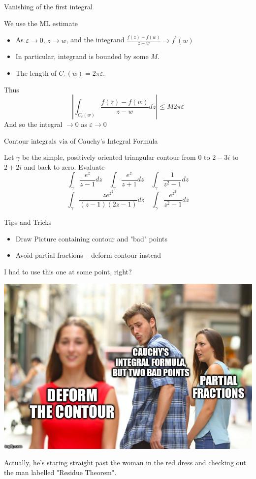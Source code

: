 \documentclass{beamer}
\begin{document}
\begin{frame}{Vanishing of the first integral}
\begin{block}{We use the ML estimate}
\begin{itemize}
    \item As $\varepsilon\to 0$, $z\to w$, and the integrand $\frac{f(z)-f(w)}{z-w}\to f^\prime(w)$
    \item In particular, integrand is bounded by some $M$.
 \item The length of $C_{\varepsilon}(w)=2\pi \varepsilon$.
\end{itemize}
Thus
$$\left|\int_{C_\varepsilon(w)}  \frac{f(z)-f(w)}{z-w}dz\right|\leq M2\pi\varepsilon$$
And so the integral $\to 0$ as $\varepsilon\to 0$


\end{block}
\end{frame}
\begin{frame}{Contour integrals via of Cauchy's Integral Formula}
\begin{example}[Section 9.3]Let $\gamma$ be the simple, positively oriented triangular contour from 0 to $2-3i$ to $2+2i$ and back to zero.  Evaluate
$$\int_\gamma \frac{e^z}{z-1}dz \quad \int_\gamma \frac{e^z}{z+1}dz \quad \int_\gamma \frac{1}{z^2-1}dz $$
$$\int_\gamma \frac{ze^{z^2}}{(z-1)(2z-1)}dz \quad \int_\gamma \frac{e^{z^2}}{z^2-1}dz$$

\end{example}

\begin{block}{Tips and Tricks}
\begin{itemize}

\item \alert{Draw Picture} containing contour and "bad" points
\item Avoid partial fractions -- deform contour instead \Cooley
\end{itemize}
\end{block}
\end{frame}

\begin{frame}{I had to use this one at some point, right?}

\includegraphics[width=\textwidth,height=0.8\textheight,keepaspectratio]{DistractedCauchy.jpg}

Actually, he's staring straight past the woman in the red dress and checking out the man labelled "Residue Theorem".
\end{frame}
\end{document}
